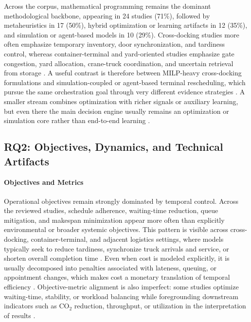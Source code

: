 \documentclass[preprint,12pt,number,longtitle]{elsarticle}
\begin{document}
Across the corpus, mathematical programming remains the dominant methodological backbone, appearing in 24 studies (71\%), followed by metaheuristics in 17 (50\%), hybrid optimization or learning artifacts in 12 (35\%), and simulation or agent-based models in 10 (29\%). Cross-docking studies more often emphasize temporary inventory, door synchronization, and tardiness control, whereas container-terminal and yard-oriented studies emphasize gate congestion, yard allocation, crane-truck coordination, and uncertain retrieval from storage \cite{nasiri2022,abbas2018,luan2025}. A useful contrast is therefore between MILP-heavy cross-docking formulations and simulation-coupled or agent-based terminal rescheduling, which pursue the same orchestration goal through very different evidence strategies \cite{nasiri2022,abbas2018,torbali2023}. A smaller stream combines optimization with richer signals or auxiliary learning, but even there the main decision engine usually remains an optimization or simulation core rather than end-to-end learning \cite{dasilva2023,luan2025,nogueira2025}.

\subsection{RQ2: Objectives, Dynamics, and Technical Artifacts}

\paragraph{Objectives and Metrics}
Operational objectives remain strongly dominated by temporal control. Across the reviewed studies, schedule adherence, waiting-time reduction, queue mitigation, and makespan minimization appear more often than explicitly environmental or broader systemic objectives. This pattern is visible across cross-docking, container-terminal, and adjacent logistics settings, where models typically seek to reduce tardiness, synchronize truck arrivals and service, or shorten overall completion time \cite{nasiri2022,fonseca2024,eti2025,zheng2026,cekala2015,modica2024,nogueira2025}. Even when cost is modeled explicitly, it is usually decomposed into penalties associated with lateness, queuing, or appointment changes, which makes cost a monetary translation of temporal efficiency \cite{xu2022,xu2021,vahdani2019,wang2023}. Objective-metric alignment is also imperfect: some studies optimize waiting-time, stability, or workload balancing while foregrounding downstream indicators such as $\mathrm{CO_2}$ reduction, throughput, or utilization in the interpretation of results \cite{bouyahia2025,fonseca2024,noh2025,zhang2022}.
\end{document}
